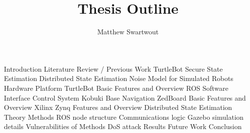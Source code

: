 \documentclass{article}
\begin{document}
\title{Thesis Outline}
\author{Matthew Swartwout}
\maketitle

\begin{outline}
\1 Introduction
\1 Literature Review / Previous Work
    \2 TurtleBot
    \2 Secure State Estimation
    \2 Distributed State Estimation
    \2 Noise Model for Simulated Robots
\1 Hardware Platform
    \2 TurtleBot
        \3 Basic Features and Overview
        \3 ROS Software Interface
        \3 Control System
            \4 Kobuki Base
            \4 Navigation
    \2 ZedBoard
        \3 Basic Features and Overview
        \3 Xilinx Zynq Features and Overview
\1 Distributed State Estimation
    \2 Theory
    \2 Methods
        \3 ROS node structure
        \3 Communications logic
        \3 Gazebo simulation details
    \2 Vulnerabilities of Methods
        \3 DoS attack
\1 Results
\1 Future Work
\1 Conclusion
\end{outline}
\end{document}
